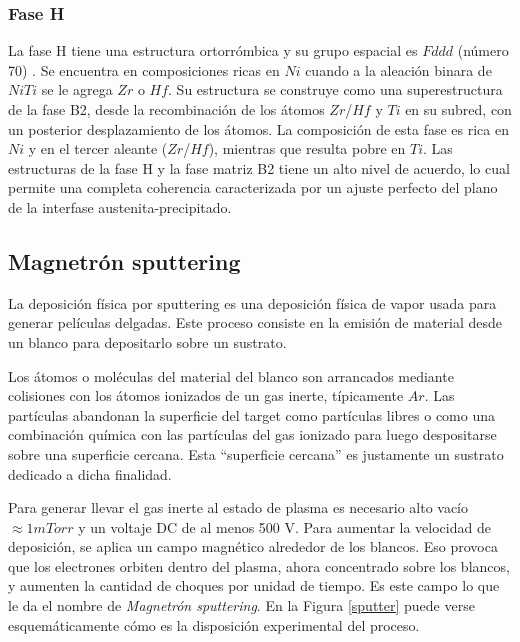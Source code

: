 \documentclass[12pt]{article}
\theoremstyle{definition}
\theoremstyle{remark}
\begin{document}
\subsubsection{Fase H}
La fase H tiene una estructura ortorrómbica y su grupo espacial es $Fddd$ (número 70) \cite{Yang2013} \cite{Santamarta2013}. Se encuentra en composiciones ricas en $Ni$ cuando a la aleación binara de $NiTi$ se le agrega $Zr$ o $Hf$. Su estructura se construye como una superestructura de la fase B2, desde la recombinación de los átomos $Zr$/$Hf$ y $Ti$ en su subred, con un posterior desplazamiento de los átomos\cite{Evirgen2018}. La composición de esta fase es rica en $Ni$ y en el tercer aleante ($Zr$/$Hf$), mientras que resulta pobre en $Ti$. Las estructuras de la fase H y la fase matriz B2 tiene un alto nivel de acuerdo, lo cual permite una completa coherencia caracterizada por un ajuste perfecto del plano de la interfase austenita-precipitado\cite{Evirgen2018}.


\subsection{Magnetrón sputtering}
La deposición física por sputtering es una deposición física de vapor usada para generar películas delgadas. Este proceso consiste en la emisión de material desde un blanco para depositarlo sobre un sustrato. 

 Los átomos o moléculas del material del blanco son arrancados mediante colisiones con los átomos ionizados de un gas inerte, típicamente $Ar$. Las partículas abandonan la superficie del target como partículas libres o como una combinación química con las partículas del gas ionizado para luego despositarse sobre una superficie cercana.  Esta ``superficie cercana'' es justamente un sustrato dedicado a dicha finalidad.
 
Para generar llevar el gas inerte al estado de plasma es necesario alto vacío $\approx 1 mTorr$ y un voltaje DC de al menos 500 V. Para aumentar la velocidad de deposición, se aplica un campo magnético alrededor de los blancos. Eso provoca que los electrones orbiten dentro del plasma, ahora concentrado sobre los blancos, y aumenten la cantidad de choques por unidad de tiempo. Es este campo lo que le da el nombre de \textit{Magnetrón sputtering}\cite{Malvasio}\cite{ThinFilm}. En la Figura \ref{sputter} puede verse esquemáticamente cómo es la disposición experimental del proceso.
\end{document}
